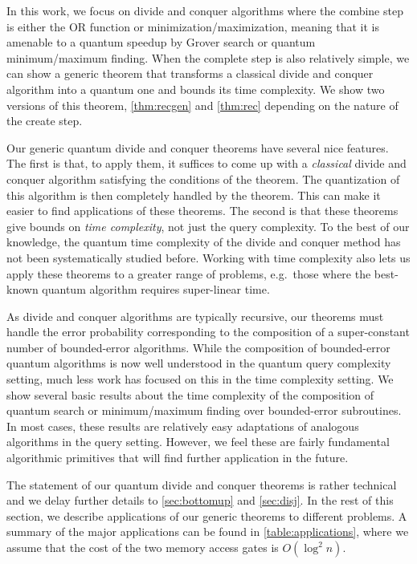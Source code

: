 \documentclass[12pt]{article}
\theoremstyle{definition}
\begin{document}
In this work, we focus on divide and conquer algorithms where the combine step is either the OR function or minimization/maximization, meaning that it is amenable to a quantum speedup by Grover search or quantum minimum/maximum finding.  
When the complete step is also relatively simple, we can show a generic theorem that transforms a classical divide and conquer algorithm into a quantum one and bounds its time complexity.  We show two versions of this theorem, \cref{thm:recgen} and \cref{thm:rec} depending on the nature of the create step.

Our generic quantum divide and conquer theorems have several nice features.  
The first is that, to apply them, it suffices to come up with a \emph{classical} divide and conquer algorithm satisfying the conditions of the theorem.  The quantization of this algorithm is then completely handled by the theorem. This can make it easier to find applications of 
these theorems.  The second is that these theorems give bounds on \emph{time complexity}, not just the query complexity. 
To the best of our knowledge, the quantum time complexity of the divide and conquer method has not been systematically studied before.  Working with time complexity also lets us apply these theorems to a greater range of problems, e.g.\ those where the best-known quantum algorithm requires super-linear time.

As divide and conquer algorithms are typically recursive, our theorems must handle the error probability corresponding to the composition of a super-constant number of bounded-error algorithms. 
While the composition of bounded-error quantum algorithms is now well understood in the quantum query complexity setting, much less work has focused on this in the time complexity setting. 
We show several basic results about the time complexity of the composition of quantum search or minimum/maximum finding over bounded-error subroutines. 
In most cases, these results are relatively easy adaptations of analogous algorithms in the query setting.  
However, we feel these are fairly fundamental algorithmic primitives that will find further application in the future.

The statement of our quantum divide and conquer theorems is rather technical and we delay further details to \cref{sec:bottomup} and \cref{sec:disj}. 
In the rest of this section, we describe applications of our generic theorems to different problems.
A summary of the major applications can be found in \cref{table:applications}, where we assume that the cost of the two memory access gates is $O(\log^2 n)$. 
\end{document}
